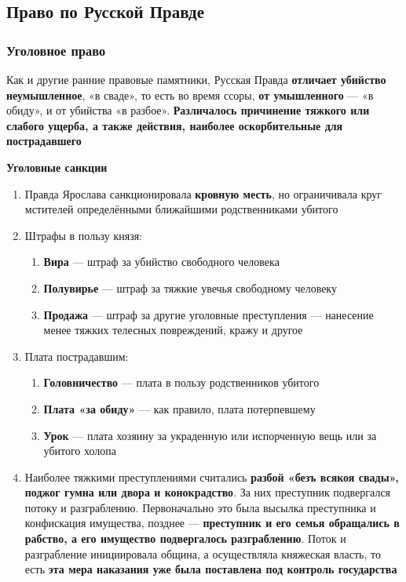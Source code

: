 \documentclass{article}
\begin{document}
\subsection{Право по Русской Правде}

\subsubsection{Уголовное право}

Как и другие ранние правовые памятники, Русская Правда \textbf{отличает убийство неумышленное}, «в сваде», то есть во время ссоры, \textbf{от умышленного} — «в обиду», и от убийства «в разбое». \textbf{Различалось причинение тяжкого или слабого ущерба, а также действия, наиболее оскорбительные для пострадавшего}

\textbf{Уголовные санкции}

\begin{enumerate}
    \item Правда Ярослава санкционировала \textbf{кровную месть}, но ограничивала круг мстителей определёнными ближайшими родственниками убитого
    \item Штрафы в пользу князя:
    \begin{enumerate}
        \item \textbf{Вира} — штраф за убийство свободного человека
        \item \textbf{Полувирье} — штраф за тяжкие увечья свободному человеку
        \item \textbf{Продажа} — штраф за другие уголовные преступления — нанесение менее тяжких телесных повреждений, кражу и другое
    \end{enumerate}
    \item Плата пострадавшим:
    \begin{enumerate}
        \item \textbf{Головничество} — плата в пользу родственников убитого
        \item \textbf{Плата «за обиду»} — как правило, плата потерпевшему
        \item \textbf{Урок} — плата хозяину за украденную или испорченную вещь или за убитого холопа
    \end{enumerate}
    \item Наиболее тяжкими преступлениями считались \textbf{разбой «безъ всякоя свады», поджог гумна или двора и конокрадство}. За них преступник подвергался потоку и разграблению. Первоначально это была высылка преступника и конфискация имущества, позднее — \textbf{преступник и его семья обращались в рабство, а его имущество подвергалось разграблению}. Поток и разграбление инициировала община, а осуществляла княжеская власть, то есть \textbf{эта мера наказания уже была поставлена под контроль государства}
\end{enumerate}
\end{document}
